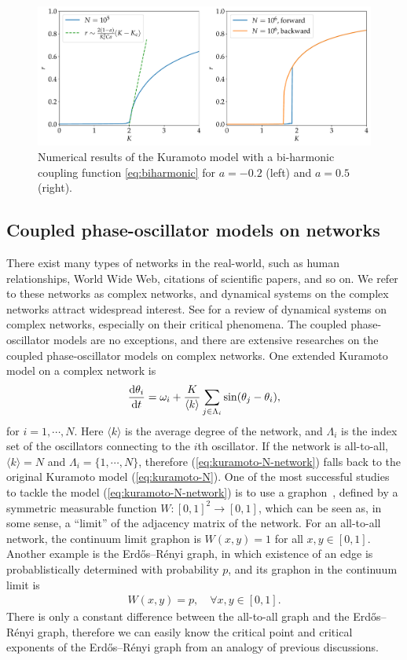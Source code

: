 \begin{figure}[htbp]
  \includegraphics[width=\textwidth]{figs/kuramoto_biharmonic.pdf}
  \caption{Numerical results of the Kuramoto model with a bi-harmonic coupling function \eqref{eq:biharmonic} for $a=-0.2$ (left) and $a=0.5$ (right).
  }
  \label{fig:kuramoto-biharmonic}
\end{figure}

\subsection{Coupled phase-oscillator models on networks}
There exist many types of networks in the real-world,
such as human relationships, World Wide Web, citations of scientific papers, and so on.
We refer to these networks as complex networks,
and dynamical systems on the complex networks attract widespread interest.
See \cite{dorogovtsev2008} for a review of dynamical systems on complex networks,
especially on their critical phenomena.
The coupled phase-oscillator models are no exceptions,
and there are extensive researches on the coupled phase-oscillator models on complex networks.
One extended Kuramoto model on a complex network is
\begin{align}
  \frac{\mathrm{d}\theta_{i}}{\mathrm{d} t}=\omega_{i}+\frac{K}{\langle k\rangle}\sum_{j\in\Lambda_{i}}\sin(\theta_{j}-\theta_{i}),
  \label{eq:kuramoto-N-network}
\end{align}
for $i=1,\cdots,N$.
Here $\langle k\rangle$ is the average degree of the network,
and $\Lambda_{i}$ is the index set of the oscillators connecting to the $i$th oscillator.
If the network is all-to-all, $\langle k\rangle=N$ and $\Lambda_{i}=\{1,\cdots,N\}$,
therefore (\ref{eq:kuramoto-N-network}) falls back to the original Kuramoto model (\ref{eq:kuramoto-N}).
One of the most successful studies to tackle the model (\ref{eq:kuramoto-N-network}) is
to use a graphon~\cite{chiba2018},
defined by a symmetric measurable function $W:[0,1]^{2}\to[0,1]$,
which can be seen as, in some sense, a ``limit'' of the adjacency matrix of the network.
For an all-to-all network, the continuum limit graphon is $W(x,y)=1$ for all $x,y\in[0,1]$.
Another example is the Erd\H{o}s--R\'{e}nyi graph,
in which existence of an edge is probablistically determined with probability $p$,
and its graphon in the continuum limit is
\begin{align}
  W(x,y)=p,\quad \forall x,y\in[0,1].
\end{align}
There is only a constant difference between the all-to-all graph and the Erd\H{o}s--R\'{e}nyi graph,
therefore we can easily know the critical point and critical exponents of the Erd\H{o}s--R\'{e}nyi graph
from an analogy of previous discussions.

